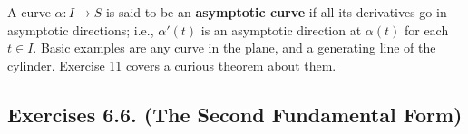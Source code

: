 \documentclass[leqno]{book}
\begin{document}
A curve $\alpha:I\to S$ is said to be an \textbf{asymptotic curve} if all its derivatives go in asymptotic directions; i.e., $\alpha'(t)$ is an asymptotic direction at $\alpha(t)$ for each $t\in I$.  Basic examples are any curve in the plane, and a generating line of the cylinder.  Exercise 11 covers a curious theorem about them.

\subsection*{Exercises 6.6. (The Second Fundamental Form)} %
\end{document}
